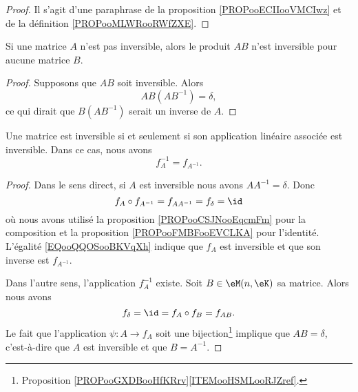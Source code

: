 \begin{proof}
	Il s'agit d'une paraphrase de la proposition \ref{PROPooECIIooVMCIwz} et de la définition \ref{PROPooMLWRooRWfZXE}.
\end{proof}

\begin{lemma}       \label{LEMooZDNVooArIXzC}
	Si une matrice \( A\) n'est pas inversible, alors le produit \( AB\) n'est inversible pour aucune matrice \( B\).
\end{lemma}

\begin{proof}
	Supposons que \( AB\) soit inversible. Alors
	\begin{equation}
		AB(AB^{-1})=\delta,
	\end{equation}
	ce qui dirait que \( B(AB^{-1})\) serait un inverse de \( A\).
\end{proof}

\begin{proposition}     \label{PROPooNPMCooPmaCwu}
	Une matrice est inversible si et seulement si son application linéaire associée est inversible. Dans ce cas, nous avons
	\begin{equation}
		f_A^{-1}=f_{A^{-1}}.
	\end{equation}
\end{proposition}

\begin{proof}
	Dans le sens direct, si \( A\) est inversible nous avons \( AA^{-1}=\delta\). Donc
	\begin{equation}        \label{EQooQQOSooBKVqXh}
		f_A\circ f_{A^{-1}}=f_{AA^{-1}}=f_{\delta}=\id
	\end{equation}
	où nous avons utilisé la proposition \ref{PROPooCSJNooEqcmFm} pour la composition et la proposition \ref{PROPooFMBFooEVCLKA} pour l'identité. L'égalité \eqref{EQooQQOSooBKVqXh} indique que \( f_A\) est inversible et que son inverse est \( f_{A^{-1}}\).

	Dans l'autre sens, l'application \( f_A^{-1}\) existe. Soit \( B\in \eM(n,\eK)\) sa matrice. Alors nous avons
	\begin{equation}
		f_{\delta}=\id=f_A\circ f_B=f_{AB}.
	\end{equation}
	Le fait que l'application \(\psi\colon A\to f_A\) soit une bijection\footnote{Proposition \ref{PROPooGXDBooHfKRrv}\ref{ITEMooHSMLooRJZref}.} implique que \( AB=\delta\), c'est-à-dire que \( A\) est inversible et que \( B=A^{-1}\).
\end{proof}

